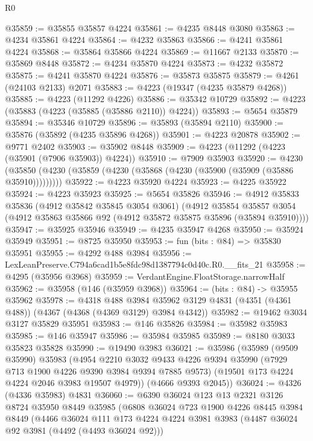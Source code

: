 \begin{lexlean}{R0}
\begin{coremodule}
@35859 := @35855 @35857 @4224
@35861 := @4235 @8448 @3080
@35863 := @4234 @35861 @4224
@35864 := @4232 @35863
@35866 := @4241 @35861 @4224
@35868 := @35864 @35866 @4224
@35869 := @11667 @2133
@35870 := @35869 @8448
@35872 := @4234 @35870 @4224
@35873 := @4232 @35872
@35875 := @4241 @35870 @4224
@35876 := @35873 @35875
@35879 := @4261 (@24103 @2133) @2071
@35883 := @4223 (@19347 (@4235 @35879 @4268))
@35885 := @4223 (@11292 @4226)
@35886 := @35342 @10729
@35892 := @4223 (@35883 (@4223 (@35885 (@35886 @2110)) @4224))
@35893 := @5654 @35879
@35894 := @35346 @10729
@35896 := @35893 (@35894 @2110)
@35900 := @35876 (@35892 (@4235 @35896 @4268))
@35901 := @4223 @20878
@35902 := @9771 @2402
@35903 := @35902 @8448
@35909 := @4223 (@11292 (@4223 (@35901 (@7906 @35903)) @4224))
@35910 := @7909 @35903
@35920 := @4230 (@35850 (@4230 (@35859 (@4230 (@35868 (@4230 (@35900 (@35909 (@35886 @35910)))))))))
@35922 := @4223 @35920 @4224
@35923 := @4225 @35922
@35924 := @4223 @35923
@35925 := @5654 @35826
@35946 := @4912
    @35833
    @35836
    (@4912 @35842 @35845 @3054 @3061)
    (@4912
      @35854
      @35857
      @3054
      (@4912 @35863 @35866 @92 (@4912 @35872 @35875 @35896 (@35894 @35910))))
@35947 := @35925 @35946
@35949 := @4235 @35947 @4268
@35950 := @35924 @35949
@35951 := @8725 @35950
@35953 := fun (bits : @84) => @35830 @35951
@35955 := @4292 @488 @3984
@35956 := LexLeanPreserve.C794a6cad1b5e8fdc98d1387794c0d40c.R0.__fits_21
@35958 := @4295 (@35956 @3968)
@35959 := VerdantEngine.FloatStorage.narrowHalf
@35962 := @35958 (@146 (@35959 @3968))
@35964 := (bits : @84) -> @35955 @35962
@35978 := @4318
    @488
    @3984
    @35962
    @3129
    @4831
    (@4351 (@4361 @488))
    (@4367 (@4368 (@4369 @3129) @3984 @4342))
@35982 := @19462 @3034 @3127 @35829 @35951
@35983 := @146 @35826
@35984 := @35982 @35983
@35985 := @146 @35947
@35986 := @35984 @35985
@35989 := @8180 @3033 @35823 @35828
@35990 := @19490 @3983
@36021 := @35986
    (@35989
      (@9509 @35990)
      @35983
      (@4954
        @2210
        @3032
        @9433
        @4226
        @9394
        @35990
        (@7929 @713 @1900 @4226 @9390 @3984 @9394 @7885 @9573)
        (@19501 @173 @4224 @4224 @2046 @3983 @19507 @4979))
      (@4666 @9393 @2045))
@36024 := @4326 (@4336 @35983) @4831
@36060 := @6390
    @36024
    @123
    @13
    @2321
    @3126
    @8724
    @35950
    @8449
    @35985
    (@6808
      @36024
      @723
      @1900
      @4226
      @8445
      @3984
      @8449
      (@4466
        @36024
        @111
        @173
        @4224
        @4224
        @3981
        @3983
        (@4487 @36024 @92 @3981 (@4492 (@4493 @36024 @92)))

\end{coremodule}
\end{lexlean}
